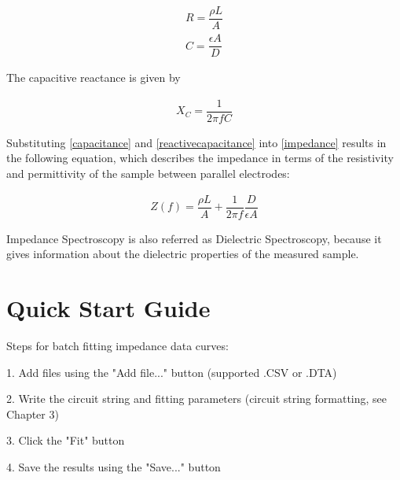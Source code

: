 \documentclass[9pt,a4paper,oneside]{book}
\begin{document}
\begin{align}
R = \dfrac{\rho L}{A} \label{resistance} \\
C = \dfrac{\epsilon A}{D} \label{capacitance}
\end{align}

The capacitive reactance is given by

\begin{align}
X_C = \dfrac{1}{2\pi{}fC}	\label{reactivecapacitance}
\end{align}

Substituting \eqref{capacitance} and \eqref{reactivecapacitance} into \eqref{impedance} results in the following equation, which describes the impedance in terms of the resistivity and permittivity of the sample between parallel electrodes:

\begin{align}
Z(f) = \dfrac{\rho L}{A} + \dfrac{1}{2\pi{}f} \dfrac{D}{\epsilon A}
\end{align}

Impedance Spectroscopy is also referred as Dielectric Spectroscopy, because it gives information about the dielectric properties of the measured sample.

%
%
%
%
%

\chapter{Quick Start Guide}

Steps for batch fitting impedance data curves:

1. Add files using the "Add file..." button (supported .CSV or .DTA)

2. Write the circuit string and fitting parameters (circuit string formatting, see Chapter 3)

3. Click the "Fit" button

4. Save the results using the "Save..." button
\end{document}
